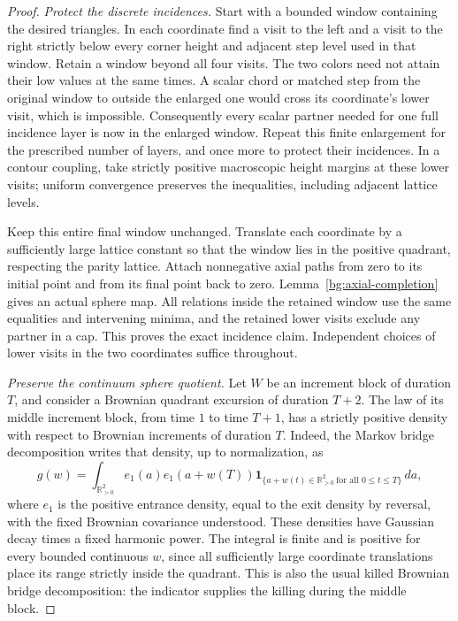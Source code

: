 \begin{proof}
\emph{Protect the discrete incidences.} Start with a bounded window
containing the desired triangles. In each coordinate find a visit to
the left and a visit to the right strictly below every corner height and adjacent step level used in
that window. Retain a window beyond all four visits. The two colors
need not attain their low values at the same times. A scalar chord
or matched step from the original window to outside the enlarged
one would cross its coordinate's lower visit, which is impossible.
Consequently every scalar partner needed for one full incidence
layer is now in the enlarged window. Repeat this finite enlargement
for the prescribed number of layers, and once more to protect their
incidences. In a contour coupling, take strictly positive macroscopic
height margins at these lower visits; uniform convergence preserves
the inequalities, including adjacent lattice levels.

Keep this entire final window unchanged. Translate each coordinate
by a sufficiently large lattice constant so that the window lies
in the positive quadrant, respecting the parity lattice. Attach
nonnegative axial paths from zero to its initial point and from its
final point back to zero. Lemma~\ref{bg:axial-completion} gives an
actual sphere map. All relations inside the retained window use the
same equalities and intervening minima, and the retained lower
visits exclude any partner in a cap. This proves the exact incidence
claim. Independent choices of lower visits in the two coordinates
suffice throughout.

\emph{Preserve the continuum sphere quotient.} Let $W$ be an
increment block of duration $T$, and consider a Brownian
quadrant excursion of duration $T+2$. The law of its middle increment
block, from time $1$ to time $T+1$, has a strictly positive density
with respect to Brownian increments of duration $T$. Indeed, the
Markov bridge decomposition writes that density, up to normalization,
as
\[
 g(w)=\int_{\mathbb R_{>0}^2}
 e_1(a)e_1(a+w(T))
 \boldsymbol 1_{\{a+w(t)\in\mathbb R_{>0}^2\ \text{for all }0\le t\le T\}}
 \,da,
\]
where $e_1$ is the positive entrance density, equal to the exit
density by reversal, with the fixed Brownian covariance understood.
These densities have Gaussian decay times a fixed harmonic power.
The integral is finite and is positive for every bounded continuous
$w$, since all sufficiently large coordinate translations place
its range strictly inside the quadrant. This is also the usual
killed Brownian bridge decomposition: the indicator supplies the
killing during the middle block.


\end{proof}
